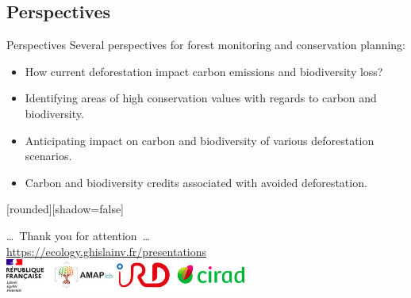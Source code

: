 \documentclass[10pt,table,dvipsnames,compress]{beamer}
\begin{document}
\subsection{Perspectives}
\label{sec:orgeac5412}

\begin{frame}[label={sec:org8a0ef17}]{Perspectives}
Several perspectives for forest monitoring and conservation planning:
\begin{itemize}
\item How current deforestation impact carbon emissions and biodiversity loss?
\item Identifying areas of high conservation values with regards to carbon and biodiversity.
\item Anticipating impact on carbon and biodiversity of various deforestation scenarios.
\item Carbon and biodiversity credits associated with avoided deforestation.
\end{itemize}
\end{frame}


{
  [rounded][shadow=false]
  \begin{frame}[plain]
    \begin{block}{}
      \begin{center}
        \ldots~Thank you for attention~\ldots \\
        \url{https://ecology.ghislainv.fr/presentations} \\
        \includegraphics[width=0.6\textwidth]{figs/partners_logos}
      \end{center}
    \end{block}
  \end{frame}
}
\end{document}
